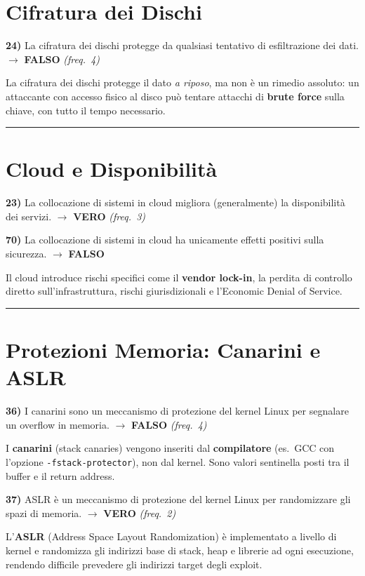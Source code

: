 \documentclass[12pt, a4paper]{report}
\newcommand{\vero}{\textcolor{verdeanswer}{\textbf{VERO}}}
\newcommand{\falso}{\textcolor{rossoanswer}{\textbf{FALSO}}}
\newcommand{\freq}[1]{\textcolor{freqcolor}{\textit{(freq.\ #1)}}}
\begin{document}
\section{Cifratura dei Dischi}

\noindent\textbf{24)} La cifratura dei dischi protegge da qualsiasi tentativo di esfiltrazione dei dati. $\to$ \falso{} \freq{4}

\medskip
\noindent La cifratura dei dischi protegge il dato \textit{a riposo}, ma non è un rimedio assoluto: un attaccante con accesso fisico al disco può tentare attacchi di \textbf{brute force} sulla chiave, con tutto il tempo necessario.

\noindent\rule{\textwidth}{0.4pt}

\section{Cloud e Disponibilità}

\noindent\textbf{23)} La collocazione di sistemi in cloud migliora (generalmente) la disponibilità dei servizi. $\to$ \vero{} \freq{3}

\medskip
\noindent\textbf{70)} La collocazione di sistemi in cloud ha unicamente effetti positivi sulla sicurezza. $\to$ \falso{}

\medskip
\noindent Il cloud introduce rischi specifici come il \textbf{vendor lock-in}, la perdita di controllo diretto sull'infrastruttura, rischi giurisdizionali e l'Economic Denial of Service.

\noindent\rule{\textwidth}{0.4pt}

\section{Protezioni Memoria: Canarini e ASLR}

\noindent\textbf{36)} I canarini sono un meccanismo di protezione del kernel Linux per segnalare un overflow in memoria. $\to$ \falso{} \freq{4}

\medskip
\noindent I \textbf{canarini} (stack canaries) vengono inseriti dal \textbf{compilatore} (es.\ GCC con l'opzione \texttt{-fstack-protector}), non dal kernel. Sono valori sentinella posti tra il buffer e il return address.

\medskip
\noindent\textbf{37)} ASLR è un meccanismo di protezione del kernel Linux per randomizzare gli spazi di memoria. $\to$ \vero{} \freq{2}

\medskip
\noindent L'\textbf{ASLR} (Address Space Layout Randomization) è implementato a livello di kernel e randomizza gli indirizzi base di stack, heap e librerie ad ogni esecuzione, rendendo difficile prevedere gli indirizzi target degli exploit.
\end{document}
